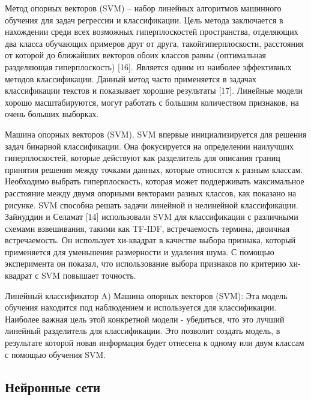 Метод опорных векторов (SVM) – набор линейных алгоритмов машинного обучения для
задач регрессии и классификации. Цель метода заключается в нахождении среди всех
возможных гиперплоскостей пространства, отделяющих два класса обучающих примеров
друг от друга, такойгиперплоскости, расстояния от которой до ближайших векторов
обоих классов равны (оптимальная разделяющая гиперплоскость) [16]. Является
одним из наиболее эффективных методов классификации. Данный метод часто
применяется в задачах классификации текстов и показывает хорошие результаты
[17]. Линейные модели хорошо масштабируются, могут работать с большим
количеством признаков, на очень больших выборках.~\cite{article9}

Машина опорных векторов (SVM). SVM впервые инициализируется для решения задач
бинарной классификации. Она фокусируется на определении наилучших
гиперплоскостей, которые действуют как разделитель для описания границ принятия
решения между точками данных, которые относятся к разным классам. Необходимо
выбрать гиперплоскость, которая может поддерживать максимальное расстояние между
двумя опорными векторами разных классов, как показано на рисунке. SVM способна
решать задачи линейной и нелинейной классификации. Зайнуддин и Селамат [14]
использовали SVM для классификации с различными схемами взвешивания, такими как
TF-IDF, встречаемость термина, двоичная встречаемость. Он использует хи-квадрат
в качестве выбора признака, который применяется для уменьшения размерности и
удаления шума. С помощью эксперимента он показал, что использование выбора
признаков по критерию хи-квадрат с SVM повышает точность.~\cite{article16}

Линейный классификатор
A) Машина опорных векторов (SVM): Эта модель обучения находится под наблюдением
и используется для классификации. Наиболее важная цель этой конкретной модели -
убедиться, что это лучший линейный разделитель для классификации. Это позволит
создать модель, в результате которой новая информация будет отнесена к одному
или двум классам с помощью обучения SVM. ~\cite{article18}

\subsection{Нейронные сети}

